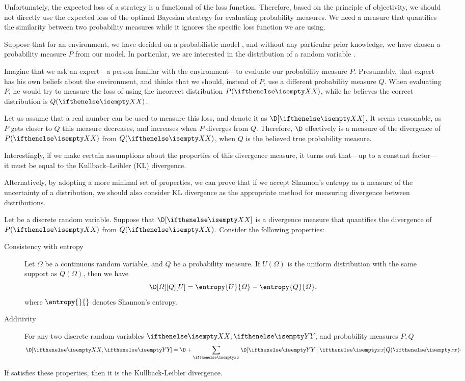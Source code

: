 Unfortunately, the expected loss of a strategy is a functional of the loss function.
Therefore, based on the principle of objectivity, we should not directly use the expected loss of the optimal Bayesian
strategy for evaluating probability measures.
We need a measure that quantifies the similarity between two probability measures while it ignores the
specific loss function we are using.

Suppose that for an environment, we have decided on a probabilistic model \M, and without any particular prior
knowledge, we have chosen a probability measure $P$ from our model.
In particular, we are interested in the distribution of a random variable \X.

Imagine that we ask an expert---a person familiar with the environment---to evaluate our probability measure $P$.
Presumably, that expert has his own beliefs about the environment, and thinks that we should, instead of $P$, use a
different probability measure $Q$.
When evaluating $P$, he would try to measure the loss of using the incorrect distribution $P(\X)$,
while he believes the correct distribution is $Q(\X)$.

Let us assume that a real number can be used to measure this loss, and denote it as $\D[\X]$.
It seems reasonable, as $P$ gets closer to $Q$ this measure decreases, and increases when $P$ diverges from $Q$.
Therefore, $\D$ effectively is a measure of the divergence of $P(\X)$ from $Q(\X)$, when $Q$ is
the believed true probability measure.

Interestingly, if we make certain assumptions about the properties of this divergence measure,
it turns out that---up to a constant factor---it must be equal to the Kullback–Leibler (KL) divergence.

Alternatively, by adopting a more minimal set of properties, we can prove that if we accept Shannon’s entropy as a
measure of the uncertainty of a distribution, we should also consider KL divergence as the appropriate method for
measuring divergence between distributions.

\begin{theorem}
    Let \X be a discrete random variable.
    Suppose that $\D[\X]$ is a divergence measure that quantifies the divergence of $P(\X)$ from $Q(\X)$.
    Consider the following properties:

    \begin{description}
        \item[Consistency with entropy] Let $\varOmega$ be a continuous random variable, and $Q$ be a probability
        measure.
        If $U(\varOmega)$ is the uniform distribution with the same support as $Q(\varOmega)$, then we have
        \[
            \D[\varOmega][Q][U] = \entropy{U}{\varOmega} - \entropy{Q}{\varOmega},
        \]
        where $\entropy{}{}$ denotes Shannon's entropy.
        \item[Additivity] For any two discrete random variables $\XY$, and probability measures $P,Q$
        \[
            \D[\XY] = \D + \sumx \D[\YIx]Q(\rval[]{x})\cdot
        \]
    \end{description}
    If  satisfies these properties, then it is the Kullback-Leibler divergence.
\end{theorem}


